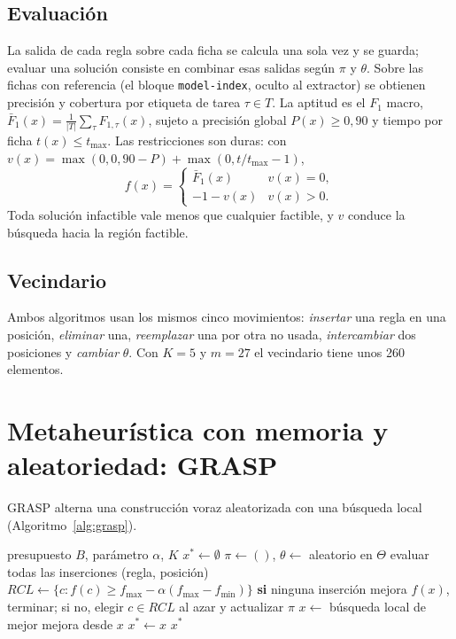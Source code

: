 \documentclass[conference]{IEEEtran}
\begin{document}
	\subsection{Evaluaci\'on}
	La salida de cada regla sobre cada ficha se calcula una sola vez y se guarda; evaluar una soluci\'on consiste en combinar esas salidas seg\'un $\pi$ y $\theta$. Sobre las fichas con referencia (el bloque \texttt{model-index}, oculto al extractor) se obtienen precisi\'on y cobertura por etiqueta de tarea $\tau\in T$. La aptitud es el $F_1$ macro, $\bar F_1(x)=\frac{1}{|T|}\sum_{\tau}F_{1,\tau}(x)$, sujeto a precisi\'on global $P(x)\ge0{,}90$ y tiempo por ficha $t(x)\le t_{\max}$. Las restricciones son duras: con $v(x)=\max(0,0{,}90-P)+\max(0,t/t_{\max}-1)$,
	\begin{equation}
		f(x)=\begin{cases}\bar F_1(x)& v(x)=0,\\ -1-v(x)& v(x)>0.\end{cases}
	\end{equation}
	Toda soluci\'on infactible vale menos que cualquier factible, y $v$ conduce la b\'usqueda hacia la regi\'on factible.
	
	\subsection{Vecindario}
	Ambos algoritmos usan los mismos cinco movimientos: \emph{insertar} una regla en una posici\'on, \emph{eliminar} una, \emph{reemplazar} una por otra no usada, \emph{intercambiar} dos posiciones y \emph{cambiar} $\theta$. Con $K=5$ y $m=27$ el vecindario tiene unos 260 elementos.
	
	\section{Metaheur\'istica con memoria y aleatoriedad: GRASP}
	
	GRASP \cite{feo} alterna una construcci\'on voraz aleatorizada con una b\'usqueda local (Algoritmo~\ref{alg:grasp}).
	
	\begin{algorithm}[t]
		\caption{GRASP con memoria}
		\label{alg:grasp}
		\small
		\begin{algorithmic}[1]
			\REQUIRE presupuesto $B$, par\'ametro $\alpha$, $K$
			\STATE $x^\ast\leftarrow\emptyset$
			\STATE $\pi\leftarrow()$, $\theta\leftarrow$ aleatorio en $\Theta$
			\STATE evaluar todas las inserciones (regla, posici\'on)
			\STATE $RCL\leftarrow\{c: f(c)\ge f_{\max}-\alpha(f_{\max}-f_{\min})\}$
			\STATE \textbf{si} ninguna inserci\'on mejora $f(x)$, terminar; si no, elegir $c\in RCL$ al azar y actualizar $\pi$
			\ENDWHILE
			\STATE $x\leftarrow$ b\'usqueda local de mejor mejora desde $x$
			 \STATE $x^\ast\leftarrow x$ \ENDIF
			\ENDWHILE
			\RETURN $x^\ast$
		\end{algorithmic}
	\end{algorithm}
	
\end{document}
